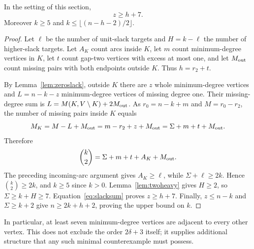 \begin{theorem}\label{thm:wholecore}
In the setting of this section,
\[
{z\ge h+7.}
\]
Moreover $k\ge5$ and
$k\le\lfloor(n-h-2)/2\rfloor$.
\end{theorem}
\begin{proof}
Let $\ell$ be the number of unit-slack targets and $H=k-\ell$ the
number of higher-slack targets. Let $A_K$ count arcs inside $K$,
let $m$ count minimum-degree vertices in $K$, let $t$ count
gap-two vertices with excess at most one, and let $M_{\rm out}$
count missing pairs with both endpoints outside $K$.
Thus $h=r_2+t$.

By Lemma~\ref{lem:zeroslack}, outside $K$ there are $z$ whole
minimum-degree vertices and $L=n-k-z$ minimum-degree vertices of
missing degree one. Their missing-degree sum is
$L=M(K,V\setminus K)+2M_{\rm out}$.
As $r_0=n-k+m$ and $M=r_0-r_2$, the number of missing pairs
inside $K$ equals
\[
M_K=M-L+M_{\rm out}
=m-r_2+z+M_{\rm out}
=\Sigma+m+t+M_{\rm out}.
\]
Therefore
\begin{equation}\label{eq:corebalance}
{\binom{k}{2}=\Sigma+m+t+A_K+M_{\rm out}.}
\end{equation}
The preceding incoming-arc argument gives $A_K\ge\ell$, while
$\Sigma+\ell\ge2k$.
Hence $\binom{k}{2}\ge2k$, and $k\ge5$ since $k>0$.
Lemma~\ref{lem:twoheavy} gives $H\ge2$, so
$\Sigma\ge k+H\ge7$. Equation~\eqref{eq:slacksum} proves $z\ge h+7$.
Finally, $z\le n-k$ and $\Sigma\ge k+2$ give
$n\ge 2k+h+2$, proving the upper bound on $k$.
\end{proof}

In particular, at least seven minimum-degree vertices are adjacent to
every other vertex. This does not exclude the order $2\delta+3$ itself;
it supplies additional structure that any such minimal counterexample
must possess.
